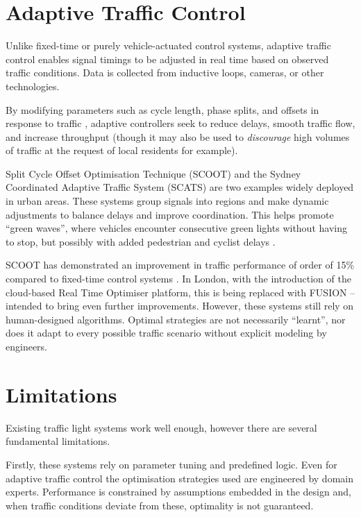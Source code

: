 \documentclass[a4paper]{report}
\begin{document}
\section{Adaptive Traffic Control}

Unlike fixed-time or purely vehicle-actuated control systems, adaptive traffic control enables signal timings to be adjusted in real time based on observed traffic conditions. Data is collected from inductive loops, cameras, or other technologies.

By modifying parameters such as cycle length, phase splits, and offsets in response to traffic \cite{LiPengHouEtAl2023}, adaptive controllers seek to reduce delays, smooth traffic flow, and increase throughput (though it may also be used to \emph{discourage} high volumes of traffic at the request of local residents for example).

Split Cycle Offset Optimisation Technique (SCOOT) and the Sydney Coordinated Adaptive Traffic System (SCATS) are two examples widely deployed in urban areas. These systems group signals into regions and make dynamic adjustments to balance delays and improve coordination. This helps promote ``green waves'', where vehicles encounter consecutive green lights without having to stop, but possibly with added pedestrian and cyclist delays \cite{CesmeUrbanikII2021}.

SCOOT has demonstrated an improvement in traffic performance of order of 15\% compared to fixed-time control systems \cite{ITS2012}. In London, with the introduction of the cloud-based Real Time Optimiser platform, this is being replaced with FUSION -- intended to bring even further improvements. However, these systems still rely on human-designed algorithms. Optimal strategies are not necessarily ``learnt'', nor does it adapt to every possible traffic scenario without explicit modeling by engineers.

\section{Limitations}

Existing traffic light systems work well enough, however there are several fundamental limitations.

Firstly, these systems rely on parameter tuning and predefined logic. Even for adaptive traffic control the optimisation strategies used are engineered by domain experts. Performance is constrained by assumptions embedded in the design and, when traffic conditions deviate from these, optimality is not guaranteed.
\end{document}
